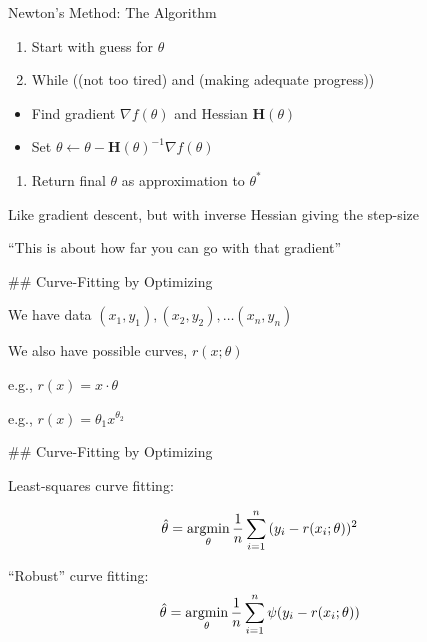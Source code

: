 \documentclass[8pt,ignorenonframetext,]{beamer}
\providecommand{\tightlist}{%
  \setlength{\itemsep}{0pt}\setlength{\parskip}{0pt}}
\begin{document}
\begin{frame}{Newton's Method: The Algorithm}

\begin{enumerate}
\def\labelenumi{\arabic{enumi}.}
\tightlist
\item
  Start with guess for \(\theta\)
\item
  While ((not too tired) and (making adequate progress))
\end{enumerate}

\begin{itemize}
\tightlist
\item
  Find gradient \(\nabla f(\theta)\) and Hessian \(\mathbf{H}(\theta)\)
\item
  Set
  \(\theta \leftarrow \theta - \mathbf{H}(\theta)^{-1} \nabla f(\theta)\)
\end{itemize}

\begin{enumerate}
\def\labelenumi{\arabic{enumi}.}
\setcounter{enumi}{2}
\tightlist
\item
  Return final \(\theta\) as approximation to \(\theta^*\)
\end{enumerate}

Like gradient descent, but with inverse Hessian giving the step-size

``This is about how far you can go with that gradient''

\#\# Curve-Fitting by Optimizing

We have data \((x_1, y_1), (x_2, y_2), \ldots (x_n, y_n)\)

We also have possible curves, \(r(x;\theta)\)

e.g., \(r(x) = x \cdot \theta\)

e.g., \(r(x) = \theta_1 x^{\theta_2}\)

\#\# Curve-Fitting by Optimizing

Least-squares curve fitting:

\[
    \hat{\theta} = \operatorname*{argmin}_{\theta}{\frac{1}{n}\sum_{i=1}^n{(y_i - r(x_i;\theta))^2}}
    \]

``Robust'' curve fitting: \[
    \hat{\theta} = \operatorname*{argmin}_{\theta}{\frac{1}{n}\sum_{i=1}^{n}{\psi(y_i - r(x_i;\theta))}}
    \]

\end{frame}
\end{document}
